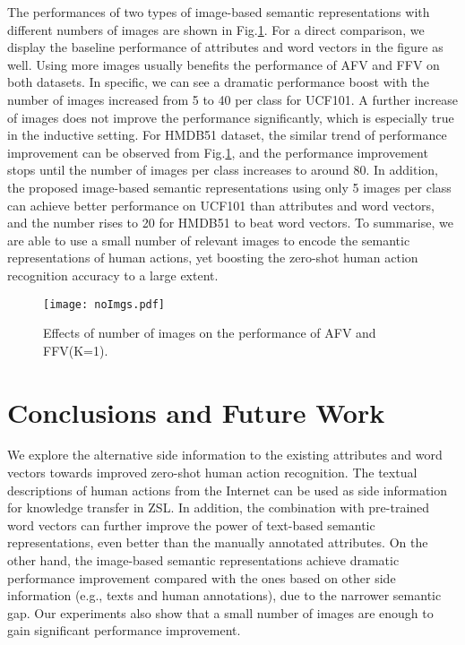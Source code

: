 \documentclass[runningheads,a4paper] {llncs}
\begin{document}
The performances of two types of image-based semantic representations with different numbers of images are shown in Fig.\ref{fig_noImgs}. For a direct comparison, we display the baseline performance of attributes and word vectors in the figure as well. Using more images usually benefits the performance of AFV and FFV on both datasets. In specific, we can see a dramatic performance boost with the number of images increased from 5 to 40 per class for UCF101. A further increase of images does not improve the performance significantly, which is especially true in the inductive setting. For HMDB51 dataset, the similar trend of performance improvement can be observed from Fig.\ref{fig_noImgs}, and the performance improvement stops until the number of images per class increases to around 80. In addition, the proposed image-based semantic representations using only 5 images per class can achieve better performance on UCF101 than attributes and word vectors, and the number rises to 20 for HMDB51 to beat word vectors. To summarise, we are able to use a small number of relevant images to encode the semantic representations of human actions, yet boosting the zero-shot human action recognition accuracy to a large extent.
\begin{figure}
\texttt{[image: noImgs.pdf]}
\caption{Effects of number of images on the performance of AFV and FFV(K=1).}
\label{fig_noImgs}
\end{figure}
\section{Conclusions and Future Work}
We explore the alternative side information to the existing attributes and word vectors towards improved zero-shot human action recognition. The textual descriptions of human actions from the Internet can be used as side information for knowledge transfer in ZSL. In addition, the combination with pre-trained word vectors can further improve the power of text-based semantic representations, even better than the manually annotated attributes. On the other hand, the image-based semantic representations achieve dramatic performance improvement compared with the ones based on other side information (e.g., texts and human annotations), due to the narrower semantic gap. Our experiments also show that a small number of images are enough to gain significant performance improvement.
\end{document}
